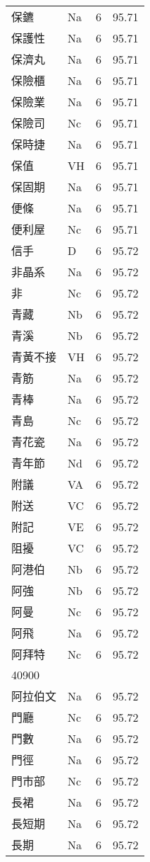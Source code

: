 \documentclass[twocolumn]{book}
\begin{document}
\begin{supertabular}{llrr}
保鑣 & Na & 6 &  95.71\\
保護性 & Na & 6 &  95.71\\
保濟丸 & Na & 6 &  95.71\\
保險櫃 & Na & 6 &  95.71\\
保險業 & Na & 6 &  95.71\\
保險司 & Nc & 6 &  95.71\\
保時捷 & Na & 6 &  95.71\\
保值 & VH & 6 &  95.71\\
保固期 & Na & 6 &  95.71\\
便條 & Na & 6 &  95.71\\
便利屋 & Nc & 6 &  95.71\\
信手 & D & 6 &  95.72\\
非晶系 & Na & 6 &  95.72\\
非 & Nc & 6 &  95.72\\
青藏 & Nb & 6 &  95.72\\
青溪 & Nb & 6 &  95.72\\
青黃不接 & VH & 6 &  95.72\\
青筋 & Na & 6 &  95.72\\
青棒 & Na & 6 &  95.72\\
青島 & Nc & 6 &  95.72\\
青花瓷 & Na & 6 &  95.72\\
青年節 & Nd & 6 &  95.72\\
附議 & VA & 6 &  95.72\\
附送 & VC & 6 &  95.72\\
附記 & VE & 6 &  95.72\\
阻擾 & VC & 6 &  95.72\\
阿港伯 & Nb & 6 &  95.72\\
阿強 & Nb & 6 &  95.72\\
阿曼 & Nc & 6 &  95.72\\
阿飛 & Na & 6 &  95.72\\
阿拜特 & Nc & 6 &  95.72\\
40900\\
阿拉伯文 & Na & 6 &  95.72\\
門廳 & Nc & 6 &  95.72\\
門數 & Na & 6 &  95.72\\
門徑 & Na & 6 &  95.72\\
門市部 & Nc & 6 &  95.72\\
長裙 & Na & 6 &  95.72\\
長短期 & Na & 6 &  95.72\\
長期 & Na & 6 &  95.72\\

\end{supertabular}
\end{document}
